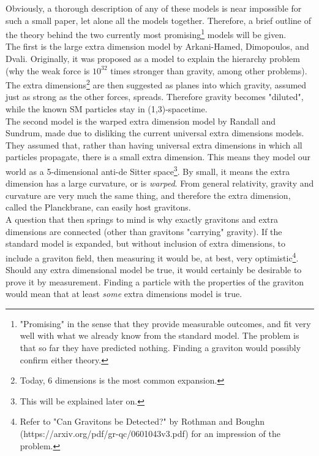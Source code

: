 \documentclass[11pt,a4paper]{article}
\begin{document}
Obviously, a thorough description of any of these models is near impossible for such a small paper, let alone all the models together. Therefore, a brief outline of the theory behind the two currently most promising\footnote{"Promising" in the sense that they provide measurable outcomes, and fit very well with what we already know from the standard model. The problem is that so far they have predicted nothing. Finding a graviton would possibly confirm either theory.} models will be given.\\
The first is the large extra dimension model by Arkani-Hamed, Dimopoulos, and Dvali. Originally, it was proposed as a model to explain the hierarchy problem (why the weak force is $10^{32}$ times stronger than gravity, among other problems). The extra dimensions\footnote{Today, 6 dimensions is the most common expansion.} are then suggested as planes into which gravity, assumed just as strong as the other forces, spreads. Therefore gravity becomes "diluted", while the known SM particles stay in (1,3)-spacetime.\\
The second model is the warped extra dimension model by Randall and Sundrum, made due to disliking the current universal extra dimensions models. They assumed that, rather than having universal extra dimensions in which all particles propagate,  there is a small extra dimension. This means they model our world as a 5-dimensional anti-de Sitter space\footnote{This will be explained later on.}. By small, it means the extra dimension has a large curvature, or is \emph{warped}. From general relativity, gravity and curvature are very much the same thing, and therefore the extra dimension, called the Planckbrane, can easily host gravitons.\\
A question that then springs to mind is why exactly gravitons and extra dimensions are connected (other than gravitons "carrying" gravity). If the standard model is expanded, but without inclusion of extra dimensions, to include a graviton field, then measuring it would be, at best, very optimistic\footnote{Refer to "Can Gravitons be Detected?" by Rothman and Boughn (https://arxiv.org/pdf/gr-qc/0601043v3.pdf) for an impression of the problem.}.
Should any extra dimensional model be true, it would certainly be desirable to prove it by measurement. Finding a particle with the properties of the graviton would mean that at least \emph{some} extra dimensions model is true.
\end{document}
